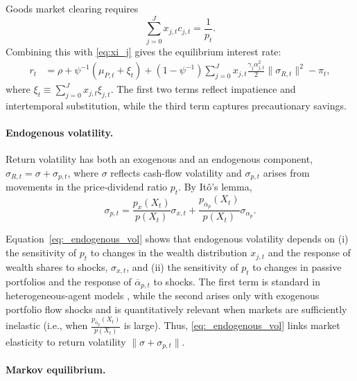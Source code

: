 \documentclass[12pt,english]{article}
\begin{document}
Goods market clearing requires
\begin{equation}
    \sum_{j=0}^J x_{j,t} c_{j,t} = \frac{1}{p_t}.
\end{equation}
Combining this with \eqref{eq:xi_j} gives the equilibrium interest rate:
\begin{align}\label{eq:interest_rate}
    r_t &= \rho + \psi^{-1} (\mu_{P,t} + \xi_t )
    + (1-\psi^{-1}) \sum_{j=0}^J x_{j,t} 
        \frac{\gamma_j \alpha_{j,t}^2}{2} \|\sigma_{R,t}\|^2
    - \pi_t,
\end{align}
where $\xi_t \equiv \sum_{j=0}^J x_{j,t} \xi_{j,t}$.  
The first two terms reflect impatience and intertemporal substitution, while the third term captures precautionary savings.

\paragraph{Endogenous volatility.} 

Return volatility has both an exogenous and an endogenous component, $\sigma_{R,t} = \sigma + \sigma_{p,t}$, where $\sigma$ reflects cash-flow volatility and $\sigma_{p,t}$ arises from movements in the price-dividend ratio $p_t$. 
By It\^{o}'s lemma,  
\begin{equation}\label{eq:_endogenous_vol}
    \sigma_{p,t} = \frac{p_x(X_t)}{p(X_t)} \sigma_{x,t} 
    + \frac{p_{\overline{\alpha}_p}(X_t)}{p(X_t)} \sigma_{\alpha_p}.
\end{equation}

Equation~\eqref{eq:_endogenous_vol} shows that endogenous volatility depends on (i) the sensitivity of $p_t$ to changes in the wealth distribution $x_{j,t}$ and the response of wealth shares to shocks, $\sigma_{x,t}$, and (ii) the sensitivity of $p_t$ to changes in passive portfolios and the response of $\overline{\alpha}_{p,t}$ to shocks. The first term is standard in heterogeneous-agent models \citep[see][]{panageas2020implications}, while the second arises only with exogenous portfolio flow shocks and is quantitatively relevant when markets are sufficiently inelastic (i.e., when $\frac{p_{\overline{\alpha}_p}(X_t)}{p(X_t)}$ is large). Thus, \eqref{eq:_endogenous_vol} links market elasticity to return volatility $\|\sigma+\sigma_{p,t}\|$.

\paragraph{Markov equilibrium.} 
\end{document}

